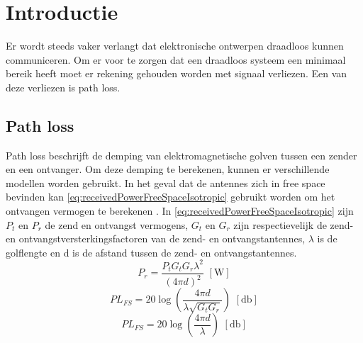 \section{Introductie}

Er wordt steeds vaker verlangt dat elektronische ontwerpen draadloos kunnen communiceren. Om er voor te zorgen dat een draadloos systeem een minimaal bereik heeft moet er rekening gehouden worden met signaal verliezen. Een van deze verliezen is path loss. 


\subsection{Path loss}
Path loss beschrijft de demping van elektromagnetische golven tussen een zender en een ontvanger. Om deze demping te berekenen, kunnen er verschillende modellen worden gebruikt. In het geval dat de antennes zich in free space bevinden kan \autoref{eq:receivedPowerFreeSpaceIsotropic} gebruikt worden om het ontvangen vermogen te berekenen \cite[13]{bensky2019shortRangeWirelessCommunication}. In \autoref{eq:receivedPowerFreeSpaceIsotropic} zijn \(P_t\) en \(P_r\) de zend en ontvangst vermogens, \(G_t\) en \(G_r\) zijn respectievelijk de zend- en ontvangstversterkingsfactoren van de zend- en ontvangstantennes, \(\lambda\) is de golflengte en d is de afstand tussen de zend- en ontvangstantennes. 
\begin{equation}\label{eq:receivedPowerFreeSpaceIsotropic}
    P_r=\frac{P_tG_tG_r\lambda^2}{\left(4\pi d\right)^2} \,\,\left[\unit{\watt}\right]
\end{equation}
\begin{equation}\label{eq:FreeSpacePathLoss}
    PL_{FS}=20\log\left(\frac{4\pi d}{\lambda\sqrt{G_tG_r}}\right) \,\,\left[\unit{\decibel}\right]
\end{equation}
\begin{equation} \label{eq:isotropicPathLoss}
    PL_{FS}=20\log\left(\frac{4\pi d}{\lambda}\right) \,\,\left[\unit{\decibel}\right]
\end{equation}

